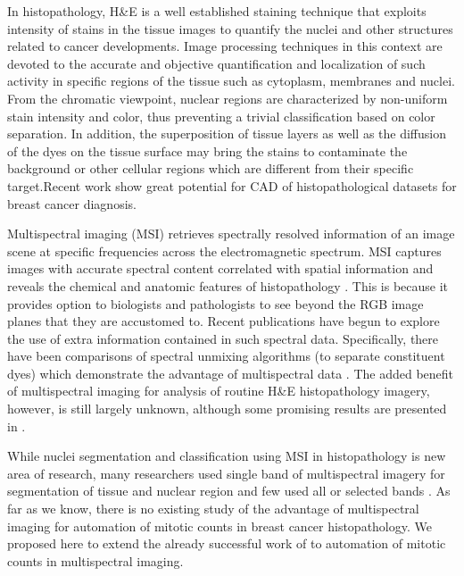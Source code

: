 \documentclass[10pt,twocolumn,letterpaper]{article}
\begin{document}
In histopathology, H\&E is a well established staining technique that exploits intensity of stains in the tissue images to quantify the nuclei and other structures related to cancer developments. Image processing techniques in this context are devoted to the accurate and objective quantification and localization of such activity in specific regions of the tissue such as cytoplasm, membranes and nuclei. From the chromatic viewpoint, nuclear regions are characterized by non-uniform stain intensity and color, thus preventing a trivial classification based on color separation. In addition, the superposition of tissue layers as well as the diffusion of the dyes on the tissue surface may bring the stains to contaminate the background or other cellular regions which are different from their specific target.Recent work \cite{khan2012b, irshad2013a, irshad2013b} show great potential for CAD of histopathological datasets for breast cancer diagnosis.


Multispectral imaging (MSI) retrieves spectrally resolved information of an image scene at specific frequencies across the electromagnetic spectrum. MSI captures images with accurate spectral content correlated with spatial information and reveals the chemical and anatomic features of histopathology \cite{levenson2006b, levenson2008}. This is because it provides option to biologists and pathologists to see beyond the RGB image planes that they are accustomed to. Recent publications \cite{fernandez2005, levenson2006, wu2012, khelifi2012} have begun to explore the use of extra information contained in such spectral data. Specifically, there have been comparisons of spectral unmixing algorithms (to separate constituent dyes) which demonstrate the advantage of multispectral data \cite{levenson2003, gentry1999}. The added benefit of multispectral imaging for analysis of routine H\&E histopathology imagery, however, is still largely unknown, although some promising results are presented in \cite{roula2003, fernandez2005, khelifi2012, wu2012}.

While nuclei segmentation and classification using MSI in histopathology is new area of research, many researchers used single band of multispectral imagery for segmentation of tissue and nuclear region \cite{boucheron2007, wu2009, masood2009} and few used all or selected bands \cite{fernandez2005, khelifi2012}. As far as we know, there is no existing study of the advantage of multispectral imaging for automation of mitotic counts in breast cancer histopathology. We proposed here to extend the already successful work of \cite{irshad2013b} to automation of mitotic counts in multispectral imaging.
\end{document}
